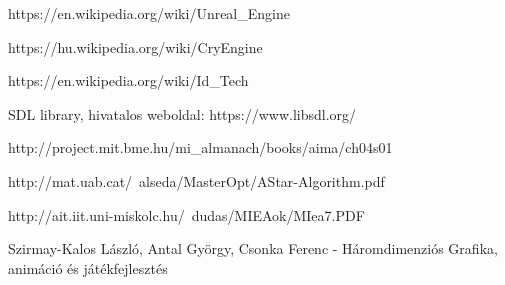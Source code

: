 \begin{thebibliography}{x}

https://en.wikipedia.org/wiki/Unreal\_Engine

https://hu.wikipedia.org/wiki/CryEngine

https://en.wikipedia.org/wiki/Id\_Tech

SDL library, hivatalos weboldal: https://www.libsdl.org/

http://project.mit.bme.hu/mi\_almanach/books/aima/ch04s01

http://mat.uab.cat/~alseda/MasterOpt/AStar-Algorithm.pdf

http://ait.iit.uni-miskolc.hu/~dudas/MIEAok/MIea7.PDF

Szirmay-Kalos László, Antal György, Csonka Ferenc - Háromdimenziós Grafika, animáció és játékfejlesztés

\end{thebibliography}
